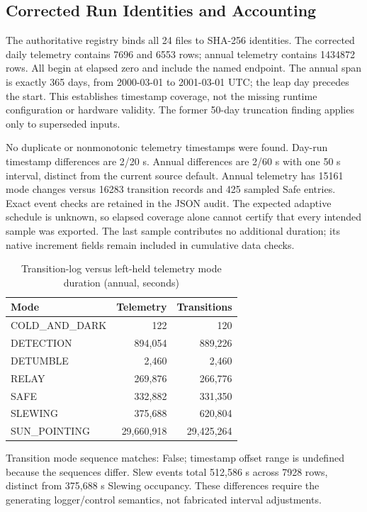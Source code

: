 \subsection{Corrected Run Identities and Accounting}\label{app:ditl-evidence}
The authoritative registry binds all 24 files to SHA-256 identities. The corrected daily telemetry contains 7696 and 6553 rows; annual telemetry contains 1434872 rows. All begin at elapsed zero and include the named endpoint. The annual span is exactly 365 days, from 2000-03-01 to 2001-03-01 UTC; the leap day precedes the start. This establishes timestamp coverage, not the missing runtime configuration or hardware validity. The former 50-day truncation finding applies only to superseded inputs.

No duplicate or nonmonotonic telemetry timestamps were found. Day-run timestamp differences are 2/20 s. Annual differences are 2/60 s with one 50 s interval, distinct from the current source default. Annual telemetry has 15161 mode changes versus 16283 transition records and 425 sampled Safe entries. Exact event checks are retained in the JSON audit. The expected adaptive schedule is unknown, so elapsed coverage alone cannot certify that every intended sample was exported. The last sample contributes no additional duration; its native increment fields remain included in cumulative data checks.
\begin{table}[H]\centering\small
\caption{Transition-log versus left-held telemetry mode duration (annual, seconds)}\label{tab:annual-overlap}
\begin{tabularx}{\linewidth}{@{}Xrr@{}}\toprule
Mode & Telemetry & Transitions\\\midrule
COLD\_AND\_DARK & 122 & 120\\
DETECTION & 894,054 & 889,226\\
DETUMBLE & 2,460 & 2,460\\
RELAY & 269,876 & 266,776\\
SAFE & 332,882 & 331,350\\
SLEWING & 375,688 & 620,804\\
SUN\_POINTING & 29,660,918 & 29,425,264\\
\bottomrule\end{tabularx}\end{table}
Transition mode sequence matches: False; timestamp offset range is undefined because the sequences differ. Slew events total 512,586 s across 7928 rows, distinct from 375,688 s Slewing occupancy. These differences require the generating logger/control semantics, not fabricated interval adjustments.
